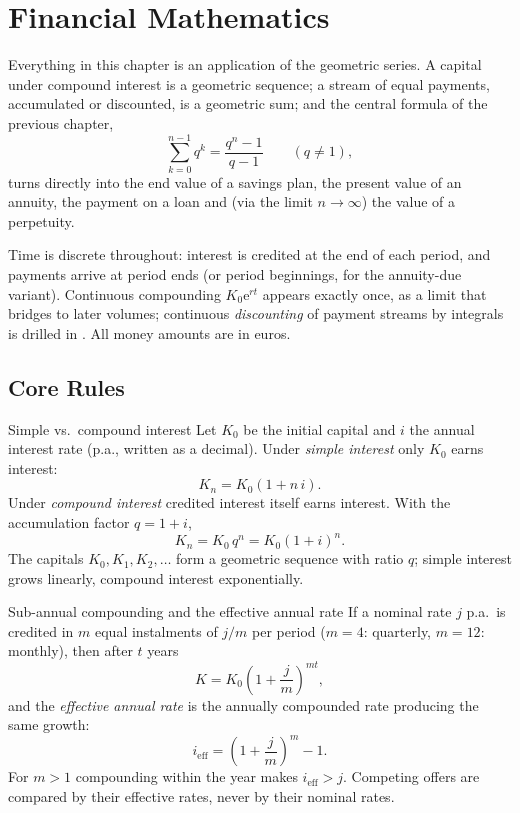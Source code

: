 \chapter{Financial Mathematics}

Everything in this chapter is an application of the geometric series. A
capital under compound interest is a geometric sequence; a stream of equal
payments, accumulated or discounted, is a geometric sum; and the central
formula of the previous chapter,
\[
  \sum_{k=0}^{n-1}q^{k}=\frac{q^{n}-1}{q-1}\qquad(q\neq 1),
\]
turns directly into the end value of a savings plan, the present value of
an annuity, the payment on a loan and (via the limit $n\to\infty$)
the value of a perpetuity.

Time is discrete throughout: interest is credited at the end of each
period, and payments arrive at period ends (or period beginnings, for the
annuity-due variant). Continuous compounding $K_{0}\mathrm{e}^{rt}$
appears exactly once, as a limit that bridges to later volumes;
continuous \emph{discounting} of payment streams by integrals is drilled
in . All money amounts are in
euros.

\section{Core Rules}

\begin{rulebox}{Simple vs.\ compound interest}
Let $K_{0}$ be the initial capital and $i$ the annual interest rate
(p.a., written as a decimal). Under \emph{simple interest} only $K_{0}$ earns interest:
\[
  K_{n}=K_{0}(1+n\,i) .
\]
Under \emph{compound interest} credited interest itself
earns interest. With the accumulation factor $q=1+i$,
\[
  K_{n}=K_{0}\,q^{n}=K_{0}(1+i)^{n} .
\]
The capitals $K_{0},K_{1},K_{2},\dots$ form a geometric sequence with
ratio $q$; simple interest grows linearly, compound interest
exponentially.
\end{rulebox}

\begin{rulebox}{Sub-annual compounding and the effective annual rate}
If a nominal rate $j$ p.a.\ is credited in $m$ equal
instalments of $j/m$ per period ($m=4$: quarterly, $m=12$: monthly), then
after $t$ years
\[
  K=K_{0}\left(1+\frac{j}{m}\right)^{mt},
\]
and the \emph{effective annual rate} is the
annually compounded rate producing the same growth:
\[
  i_{\mathrm{eff}}=\left(1+\frac{j}{m}\right)^{m}-1 .
\]
For $m>1$ compounding within the year makes
$i_{\mathrm{eff}}>j$. Competing offers are compared by their effective
rates, never by their nominal rates.
\end{rulebox}

